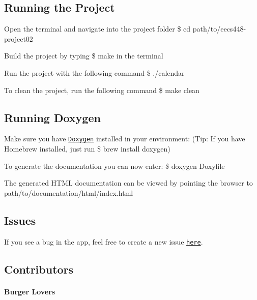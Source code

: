\subsection*{Running the Project}


\begin{DoxyItemize}
\item Open the terminal and navigate into the project folder {\ttfamily \$ cd path/to/eecs448-\/project02}
\item Build the project by typing {\ttfamily \$ make} in the terminal
\item Run the project with the following command {\ttfamily \$ ./calendar}
\end{DoxyItemize}

To clean the project, run the following command {\ttfamily \$ make clean}

\subsection*{Running Doxygen}


\begin{DoxyItemize}
\item Make sure you have \href{http://www.stack.nl/~dimitri/doxygen/download.html}{\tt Doxygen} installed in your environment\+: (Tip\+: If you have Homebrew installed, just run {\ttfamily \$ brew install doxygen})
\item To generate the documentation you can now enter\+: {\ttfamily \$ doxygen Doxyfile}
\end{DoxyItemize}

The generated H\+T\+ML documentation can be viewed by pointing the browser to {\ttfamily path/to/documentation/html/index.\+html}

\subsection*{Issues}

If you see a bug in the app, feel free to create a new issue \href{https://github.com/sharynneazhar/eecs448-project02/issues}{\tt here}.

\subsection*{Contributors}

\paragraph*{Burger Lovers}

